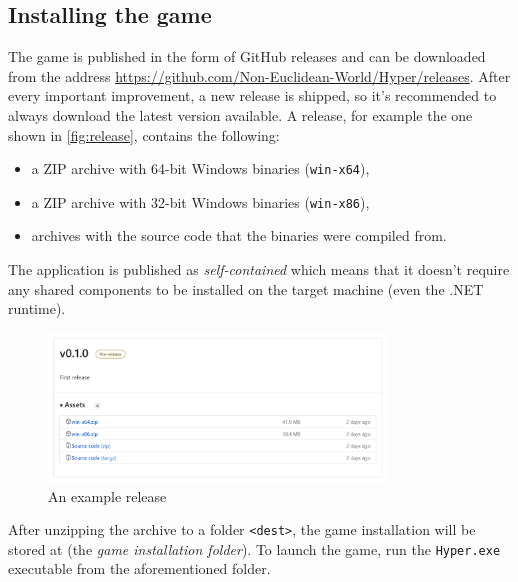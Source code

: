 \subsection{Installing the game}
The game is published in the form of GitHub releases and can be downloaded from the address \url{https://github.com/Non-Euclidean-World/Hyper/releases}.
After every important improvement, a new release is shipped, so it's recommended to always download the latest version available.
A release, for example the one shown in \autoref{fig:release}, contains the following:
\begin{itemize}
    \item a ZIP archive with 64-bit Windows binaries (\texttt{win-x64}),
    \item a ZIP archive with 32-bit Windows binaries (\texttt{win-x86}),
    \item archives with the source code that the binaries were compiled from.
\end{itemize}

The application is published as \textit{self-contained} which means that it doesn't require any shared components to be installed on the target machine (even the .NET runtime).

\begin{figure}[H]
    \centering
    \includegraphics[width=0.8\textwidth]{sections/installation_instruction/resources/release-download.png}
    \caption{An example release}
    \label{fig:release}
\end{figure}

After unzipping the archive to a folder \texttt{<dest>}, the game installation will be stored at  (the \textit{game installation folder}).
To launch the game, run the \texttt{Hyper.exe} executable from the aforementioned folder.